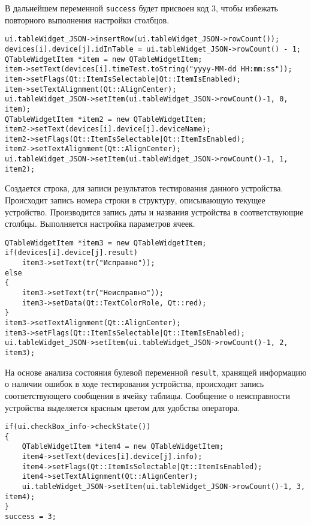В дальнейшем переменной \texttt{success} будет присвоен код 3, чтобы избежать повторного выполнения настройки столбцов.
\medskip
\begin{verbatim}
ui.tableWidget_JSON->insertRow(ui.tableWidget_JSON->rowCount());
devices[i].device[j].idInTable = ui.tableWidget_JSON->rowCount() - 1;
QTableWidgetItem *item = new QTableWidgetItem;
item->setText(devices[i].timeTest.toString("yyyy-MM-dd HH:mm:ss"));
item->setFlags(Qt::ItemIsSelectable|Qt::ItemIsEnabled);
item->setTextAlignment(Qt::AlignCenter);
ui.tableWidget_JSON->setItem(ui.tableWidget_JSON->rowCount()-1, 0, item);
QTableWidgetItem *item2 = new QTableWidgetItem;
item2->setText(devices[i].device[j].deviceName);
item2->setFlags(Qt::ItemIsSelectable|Qt::ItemIsEnabled);
item2->setTextAlignment(Qt::AlignCenter);
ui.tableWidget_JSON->setItem(ui.tableWidget_JSON->rowCount()-1, 1, item2);
\end{verbatim}
\medskip

Создается строка, для записи результатов тестирования данного устройства. Происходит запись номера строки в структуру,
описывающую текущее устройство. Производится запись даты и названия устройства в соответствующие столбцы. Выполняется
настройка параметров ячеек.

\medskip
\begin{verbatim}
QTableWidgetItem *item3 = new QTableWidgetItem;
if(devices[i].device[j].result)
	item3->setText(tr("Исправно"));
else
{
	item3->setText(tr("Неисправно"));
	item3->setData(Qt::TextColorRole, Qt::red);
}
item3->setTextAlignment(Qt::AlignCenter);
item3->setFlags(Qt::ItemIsSelectable|Qt::ItemIsEnabled);
ui.tableWidget_JSON->setItem(ui.tableWidget_JSON->rowCount()-1, 2, item3);
\end{verbatim}
\medskip

На основе анализа состояния булевой переменной \texttt{result}, хранящей информацию о наличии ошибок в ходе тестирования
устройства, происходит запись соответствующего сообщения в ячейку таблицы. Сообщение о неисправности устройства
выделяется красным цветом для удобства оператора.

\medskip
\begin{verbatim}
if(ui.checkBox_info->checkState())
{
	QTableWidgetItem *item4 = new QTableWidgetItem;
	item4->setText(devices[i].device[j].info);
	item4->setFlags(Qt::ItemIsSelectable|Qt::ItemIsEnabled);
	item4->setTextAlignment(Qt::AlignCenter);
	ui.tableWidget_JSON->setItem(ui.tableWidget_JSON->rowCount()-1, 3, item4);
}
success = 3;
\end{verbatim}
\medskip

